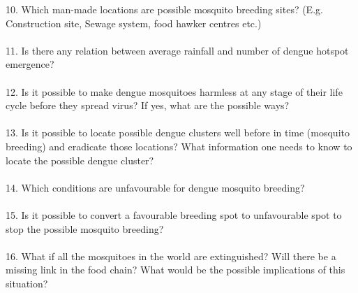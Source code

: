 \documentclass[11pt]{exam}
\begin{document}
10. Which man-made locations are possible mosquito breeding sites? (E.g. Construction site, Sewage system, food hawker centres etc.)\\ \\
11. Is there any relation between average rainfall and number of dengue hotspot emergence? \\ \\
12. Is it possible to make dengue mosquitoes harmless at any stage of their life cycle before they spread virus? If yes, what are the possible ways?\\ \\
13. Is it possible to locate possible dengue clusters well before in time (mosquito breeding) and eradicate those locations? What information one needs to know to locate the possible dengue cluster?\\ \\
14. Which conditions are unfavourable for dengue mosquito breeding? \\ \\
15. Is it possible to convert a favourable breeding spot to unfavourable spot to stop the possible mosquito breeding? \\ \\
16. What if all the mosquitoes in the world are extinguished? Will there be a missing link in the food chain? What would be the possible implications of this situation? \\ \\ \\
\end{document}
